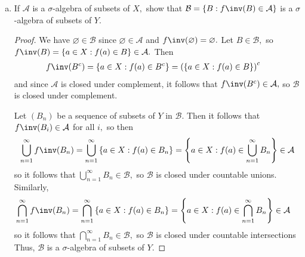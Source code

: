 \documentclass{article}
\begin{document}
\begin{itemize}
\begin{enumerate}[(a)]
\begin{proof}
					Let $(A_n)$ be a sequence of subsets of $X$ in $\mathcal A.$ Then let $(B_n)$ be a sequence of subsets in $\mathcal B$ such that $A_i=f\inv(B_i)$ for all $i.$ We have
					\begin{align*}
						\bigcup_{n=1}^\infty A_n &= \bigcup_{n=1}^\infty \left\{ a\in X: f(a)\in B_n \right\} = \left\{ a\in X:f(a)\in \bigcup_{n=1}^\infty B_n \right\}
					\end{align*} 
					and since $\mathcal B$ is closed under countable union, $\bigcup_{n=1}^\infty B_n\in\mathcal B,$ so it follows that $\bigcup_{n=1}^\infty A_n\in \mathcal A,$ so $\mathcal A$ is closed under countable union. Similarly,
					\begin{align*}
						\bigcap_{n=1}^\infty A_n &= \bigcap_{n=1}^\infty \left\{ a\in X:f(a)\in B_n \right\} = \left\{ a\in X: f(a)\in\bigcap_{n=1}^\infty B_n \right\}
					\end{align*}
					and since $\mathcal B$ is closed under countable intersection, it follows that $\bigcap_{n=1}^\infty A_n\in\mathcal A,$ so $\mathcal A$ is closed under countable intersection. Thus, $\mathcal A$ is a $\sigma$-algebra of subsets of $X.$
				\end{proof}

			\item If $\mathcal A$ is a $\sigma$-algebra of subsets of $X,$ show that $\mathcal B=\left\{ B:f\inv(B)\in\mathcal A \right\}$ is a $\sigma$-algebra of subsets of $Y.$
				\begin{proof}
					We have $\varnothing\in\mathcal B$ since $\varnothing\in\mathcal A$ and $f\inv(\varnothing)=\varnothing.$ Let $B\in\mathcal B,$ so $f\inv(B)=\left\{ a\in X:f(a)\in B \right\}\in\mathcal A.$ Then
					\begin{align*}
						f\inv(B^c) &= \left\{ a\in X:f(a)\in B^c \right\} = \left( \left\{ a\in X: f(a)\in B \right\} \right)^c
					\end{align*}
					and since $\mathcal A$ is closed under complement, it follows that $f\inv(B^c)\in\mathcal A,$ so $\mathcal B$ is closed under complement.

					Let $(B_n)$ be a sequence of subsets of $Y$ in $\mathcal B.$ Then it follows that $f\inv(B_i)\in\mathcal A$ for all $i,$ so then 
					\begin{align*}
						\bigcup_{n=1}^\infty f\inv(B_n)=\bigcup_{n=1}^\infty \left\{ a\in X: f(a)\in B_n \right\} = \left\{ a\in X: f(a)\in \bigcup_{n=1}^\infty B_n \right\} \in\mathcal A
					\end{align*}
					so it follows that $\bigcup_{n=1}^\infty B_n\in\mathcal B,$ so $\mathcal B$ is closed under countable unions. Similarly,
					\begin{align*}
						\bigcap_{n=1}^\infty f\inv(B_n) &= \bigcap_{n=1}^\infty \left\{ a\in X:f(a)\in B_n \right\} = \left\{ a\in X: f(a)\in\bigcap_{n=1}^\infty B_n\right\} \in \mathcal A
					\end{align*}
					so it follows that $\bigcap_{n=1}^\infty B_n\in \mathcal B,$ so $\mathcal B$ is closed under countable intersections Thus, $\mathcal B$ is a $\sigma$-algebra of subsets of $Y.$
				\end{proof}
				

\end{enumerate}
\end{itemize}
\end{document}
